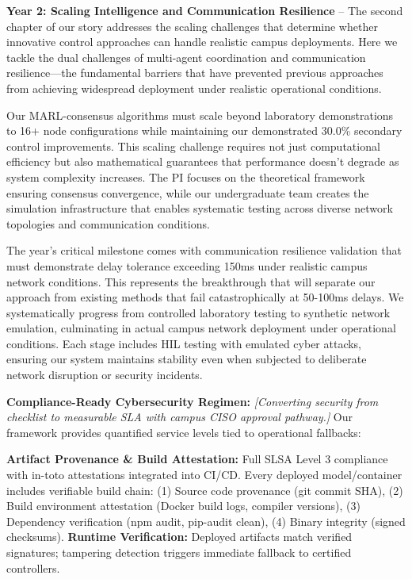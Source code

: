 \documentclass[12pt]{article}
\begin{document}
\textbf{Year 2: Scaling Intelligence and Communication Resilience} – The second chapter of our story addresses the scaling challenges that determine whether innovative control approaches can handle realistic campus deployments. Here we tackle the dual challenges of multi-agent coordination and communication resilience—the fundamental barriers that have prevented previous approaches from achieving widespread deployment under realistic operational conditions.

Our MARL-consensus algorithms must scale beyond laboratory demonstrations to 16+ node configurations while maintaining our demonstrated 30.0\% secondary control improvements. This scaling challenge requires not just computational efficiency but also mathematical guarantees that performance doesn't degrade as system complexity increases. The PI focuses on the theoretical framework ensuring consensus convergence, while our undergraduate team creates the simulation infrastructure that enables systematic testing across diverse network topologies and communication conditions.

The year's critical milestone comes with communication resilience validation that must demonstrate delay tolerance exceeding 150ms under realistic campus network conditions. This represents the breakthrough that will separate our approach from existing methods that fail catastrophically at 50-100ms delays. We systematically progress from controlled laboratory testing to synthetic network emulation, culminating in actual campus network deployment under operational conditions. Each stage includes HIL testing with emulated cyber attacks, ensuring our system maintains stability even when subjected to deliberate network disruption or security incidents.

\textbf{Compliance-Ready Cybersecurity Regimen:} \textit{[Converting security from checklist to measurable SLA with campus CISO approval pathway.]} Our framework provides quantified service levels tied to operational fallbacks:

\textbf{Artifact Provenance \& Build Attestation:} Full SLSA Level 3 compliance with in-toto attestations integrated into CI/CD. Every deployed model/container includes verifiable build chain: (1) Source code provenance (git commit SHA), (2) Build environment attestation (Docker build logs, compiler versions), (3) Dependency verification (npm audit, pip-audit clean), (4) Binary integrity (signed checksums). \textbf{Runtime Verification:} Deployed artifacts match verified signatures; tampering detection triggers immediate fallback to certified controllers.
\end{document}
